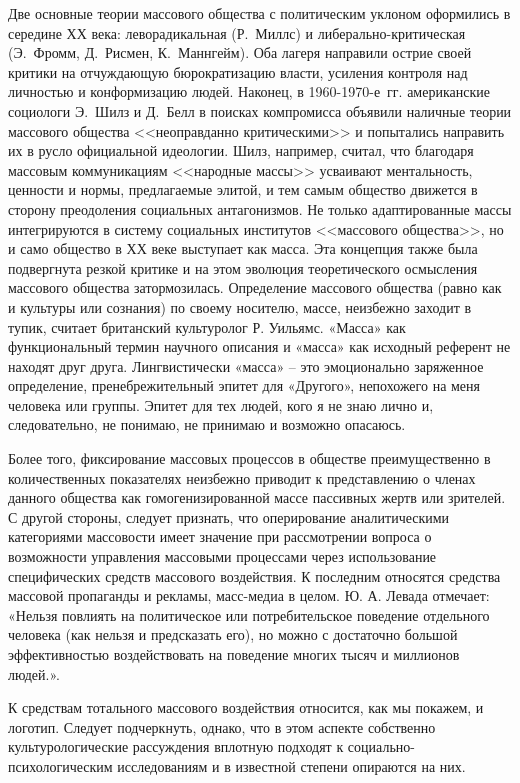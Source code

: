 Две основные теории массового общества
с политическим уклоном оформились в середине ХХ века: леворадикальная (Р.~Миллс)
и либерально-критическая (Э.~Фромм, Д.~Рисмен, К.~Маннгейм). Оба лагеря направили острие своей критики
на отчуждающую бюрократизацию власти, усиления контроля над личностью и конформизацию людей.
Наконец, в 1960-1970-е~гг. американские социологи Э.~Шилз и Д.~Белл в поисках компромисса объявили
наличные теории массового общества <<неоправданно критическими>> и попытались направить их в русло
официальной идеологии. Шилз, например, считал, что благодаря массовым коммуникациям <<народные массы>>
усваивают ментальность, ценности и нормы, предлагаемые элитой, и тем самым общество движется в сторону
преодоления социальных антагонизмов. Не только адаптированные массы интегрируются в систему
социальных институтов <<массового общества>>, но и само общество в ХХ веке выступает как масса.
Эта концепция также была подвергнута резкой критике и на этом эволюция теоретического осмысления массового
общества затормозилась. Определение массового общества (равно как и культуры или сознания) по своему носителю, массе, неизбежно заходит в тупик, считает британский культуролог Р.  Уильямс. «Масса» как функциональный термин научного описания и «масса» как исходный референт не находят друг друга. Лингвистически «масса» – это эмоционально заряженное определение, пренебрежительный эпитет для «Другого», непохожего на меня человека или группы. Эпитет для тех людей, кого я не знаю лично и, следовательно, не понимаю, не принимаю и возможно опасаюсь\autocites{williams1985}{williams1989}{williams2006}.

Более того, фиксирование массовых процессов в обществе преимущественно в количественных показателях неизбежно приводит к представлению о членах данного общества как гомогенизированной массе пассивных жертв или зрителей\autocite{levada2001}. С другой стороны, следует признать, что оперирование аналитическими категориями массовости   имеет значение при рассмотрении вопроса о возможности управления массовыми процессами через использование специфических средств массового воздействия. К последним относятся средства массовой пропаганды и рекламы, масс-медиа в целом. Ю. А. Левада отмечает: «Нельзя повлиять на политическое или потребительское поведение отдельного человека (как нельзя и предсказать его), но можно с достаточно большой эффективностью воздействовать на поведение многих тысяч и миллионов людей.»\autocite{levada2001}.

К средствам тотального массового воздействия относится, как мы покажем, и логотип. Следует подчеркнуть, однако, что в этом аспекте собственно культурологические рассуждения вплотную подходят к социально-психологическим исследованиям и в известной степени опираются на них.

